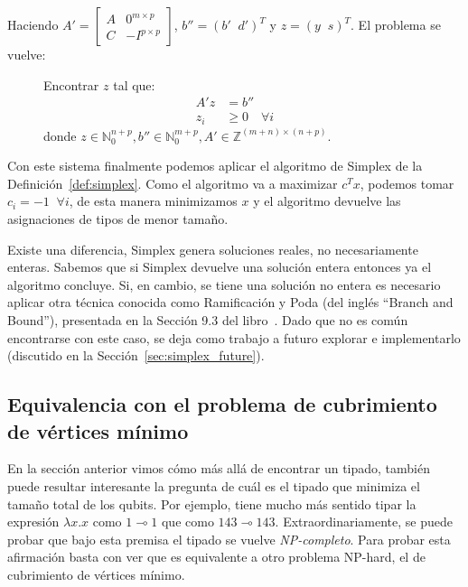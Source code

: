 Haciendo \(A'=\begin{bmatrix}
    A & 0^{m\times p} \\
    C & -I^{p\times p}
\end{bmatrix}\), $b''=(b'\;\;d')^T$ y $z = (y\;\;s)^T$. El problema se vuelve:
\begin{figure}[H]
\begin{mdframed}
Encontrar $z$ tal que:
\begin{align*}
    A'z &= b'' \\
    z_i &\geq 0\quad \forall i
\end{align*}
donde $z\in\mathbb{N}^{n+p}_0, b''\in\mathbb{N}^{m+p}_0, A'\in\mathbb{Z}^{(m+n)\times (n+p)}$.
\end{mdframed}
\end{figure}
\vspace{-2\baselineskip}
Con este sistema finalmente podemos aplicar el algoritmo de Simplex de la Definición~\ref{def:simplex}. Como el algoritmo va a maximizar $c^Tx$, podemos tomar $c_i=-1\;\;\forall i$, de esta manera minimizamos $x$ y el algoritmo devuelve las asignaciones de tipos de menor tamaño.

Existe una diferencia, Simplex genera soluciones reales, no necesariamente enteras. Sabemos que si Simplex devuelve una solución entera entonces ya el algoritmo concluye. Si, en cambio, se tiene una solución no entera es necesario aplicar otra técnica conocida como Ramificación y Poda (del inglés ``Branch and Bound''), presentada en la Sección 9.3 del libro~\cite{simplex}. Dado que no es común encontrarse con este caso, se deja como trabajo a futuro explorar e implementarlo (discutido en la Sección~\ref{sec:simplex_future}).

\subsection{Equivalencia con el problema de cubrimiento de vértices mínimo}

En la sección anterior vimos cómo más allá de encontrar un tipado, también puede resultar interesante la pregunta de cuál es el tipado que minimiza el tamaño total de los qubits. Por ejemplo, tiene mucho más sentido tipar la expresión $\lambda x.x$ como $1\multimap 1$ que como $143\multimap 143$. Extraordinariamente, se puede probar que bajo esta premisa el tipado se vuelve \emph{NP-completo}. Para probar esta afirmación basta con ver que es equivalente a otro problema NP-hard, el de cubrimiento de vértices mínimo. 

